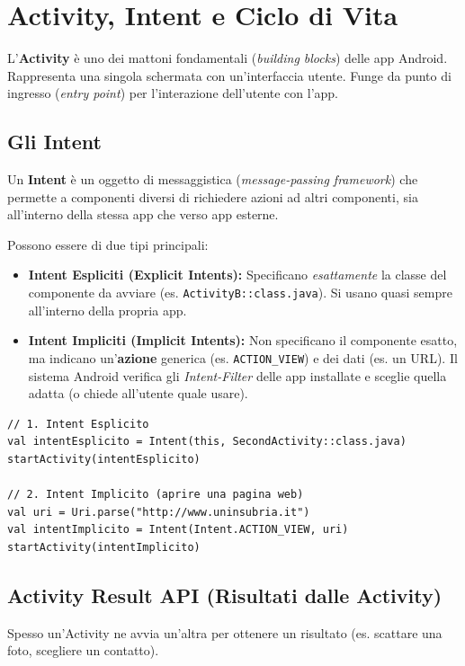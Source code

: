 
\chapter{Activity, Intent e Ciclo di Vita}

L'\textbf{Activity} è uno dei mattoni fondamentali (\textit{building blocks}) delle app Android.
Rappresenta una singola schermata con un'interfaccia utente. Funge da punto di ingresso (\textit{entry point}) per l'interazione dell'utente con l'app.

\section{Gli Intent}
Un \textbf{Intent} è un oggetto di messaggistica (\textit{message-passing framework}) che permette a componenti diversi
di richiedere azioni ad altri componenti, sia all'interno della stessa app che verso app esterne.

Possono essere di due tipi principali:
\begin{itemize}
    \item \textbf{Intent Espliciti (Explicit Intents):} Specificano \textit{esattamente} la classe del componente da avviare (es. \texttt{ActivityB::class.java}). Si usano quasi sempre all'interno della propria app.
    \item \textbf{Intent Impliciti (Implicit Intents):} Non specificano il componente esatto, ma indicano un'\textbf{azione} generica (es. \texttt{ACTION\_VIEW}) e dei dati (es.
    un URL). Il sistema Android verifica gli \textit{Intent-Filter} delle app installate e sceglie quella adatta (o chiede all'utente quale usare).
\end{itemize}

\begin{lstlisting}[caption={Esempi di Intent}, label={lst:intents}]
// 1. Intent Esplicito
val intentEsplicito = Intent(this, SecondActivity::class.java)
startActivity(intentEsplicito)

// 2. Intent Implicito (aprire una pagina web)
val uri = Uri.parse("http://www.uninsubria.it")
val intentImplicito = Intent(Intent.ACTION_VIEW, uri)
startActivity(intentImplicito)
\end{lstlisting}

\section{Activity Result API (Risultati dalle Activity)}
Spesso un'Activity ne avvia un'altra per ottenere un risultato (es.
scattare una foto, scegliere un contatto).

